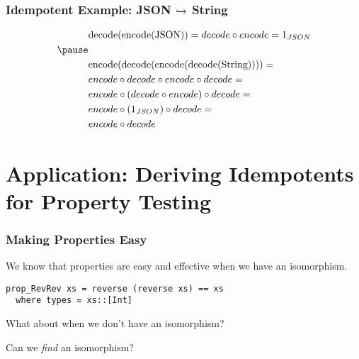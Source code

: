 \documentclass{beamer}
\begin{document}
\begin{frame}[fragile]
\frametitle{Idempotent Example: JSON {$\xhookrightarrow{}$} String}
\medskip
\begin{equation*}
\begin{aligned}
& \text{decode(encode(JSON))} = decode \circ encode = 1_{JSON} \\ \pause
& \\
& \text{encode(decode(encode(decode(String))))} = \\
& encode \circ decode \circ encode \circ decode = \\
& encode \circ (decode \circ encode) \circ decode = \\
& encode \circ (1_{JSON}) \circ decode = \\
& encode \circ decode \\
\end{aligned}
\end{equation*}
\end{frame}

\section{Application: Deriving Idempotents for Property Testing}

\begin{frame}[fragile]
\frametitle{Making Properties Easy}

We know that properties are easy and effective when we have 
an isomorphism. \\
\medskip

\begin{verbatim}
prop_RevRev xs = reverse (reverse xs) == xs
  where types = xs::[Int]
\end{verbatim}

\pause
\medskip
What about when we don't have an isomorphism? \\
\pause
\medskip

Can we \emph{find} an isomorphism?

\end{frame}
\end{document}
